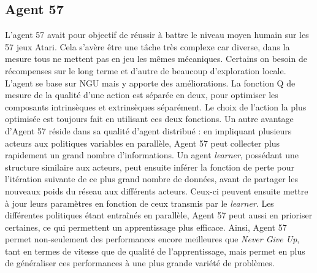 \documentclass[a4paper,12pt]{report}
\begin{document}
\subsection{Agent 57 \cite{agent57}}
\indent L'agent 57 avait pour objectif de réussir à battre le niveau moyen humain sur les 57 jeux Atari. Cela s'avère être une tâche très complexe car diverse, dans la mesure tous ne mettent pas en jeu les mêmes mécaniques. Certains on besoin de récompenses sur le long terme et d’autre de beaucoup d’exploration locale.
\newline \indent L’agent se base sur NGU mais y apporte des améliorations. La fonction Q de mesure de la qualité d’une action est séparée en deux, pour optimiser les composants intrinsèques et extrinsèques séparément. Le choix de l’action la plus optimisée est toujours fait en utilisant ces deux fonctions.
\newline
\newline \indent Un autre avantage d'Agent 57 réside dans sa qualité d'agent distribué : en impliquant plusieurs acteurs aux politiques variables en parallèle, Agent 57 peut collecter plus rapidement un grand nombre d'informations. Un agent \textit{learner}, possédant une structure similaire aux acteurs, peut ensuite inférer la fonction de perte pour l'itération suivante de ce plus grand nombre de données, avant de partager les nouveaux poids du réseau aux différents acteurs. Ceux-ci peuvent ensuite mettre à jour leurs paramètres en fonction de ceux transmis par le \textit{learner}. Les différentes politiques étant entraînés en parallèle, Agent 57 peut aussi en prioriser certaines, ce qui permettent un apprentissage plus efficace.
\newline
\newline \indent Ainsi, Agent 57 permet non-seulement des performances encore meilleures que \textit{Never Give Up}, tant en termes de vitesse que de qualité de l'apprentissage, mais permet en plus de généraliser ces performances à une plus grande variété de problèmes.
\end{document}
